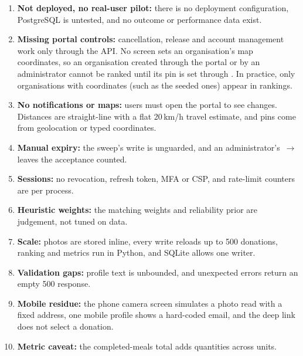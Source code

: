 \begin{enumerate}
  \item \textbf{Not deployed, no real-user pilot:} there is no deployment
    configuration, PostgreSQL is untested, and no outcome or performance data
    exist.
  \item \textbf{Missing portal controls:} cancellation, release and account
    management work only through the API. No screen sets an organisation's map
    coordinates, so an organisation created through the portal or by an
    administrator cannot be ranked until its pin is set through
    . In practice, only organisations with
    coordinates (such as the seeded ones) appear in rankings.
  \item \textbf{No notifications or maps:} users must open the portal to see
    changes. Distances are straight-line with a flat 20\,km/h travel estimate,
    and pins come from geolocation or typed coordinates.
  \item \textbf{Manual expiry:} the sweep's write is unguarded, and an
    administrator's \,$\to$\, leaves the acceptance
    counted.
  \item \textbf{Sessions:} no revocation, refresh token, MFA or CSP, and
    rate-limit counters are per process.
  \item \textbf{Heuristic weights:} the matching weights and reliability prior are
    judgement, not tuned on data.
  \item \textbf{Scale:} photos are stored inline, every write reloads up to 500
    donations, ranking and metrics run in Python, and SQLite allows one writer.
  \item \textbf{Validation gaps:} profile text is unbounded, and unexpected errors
    return an empty 500 response.
  \item \textbf{Mobile residue:} the phone camera screen simulates a photo read
    with a fixed address, one mobile profile shows a hard-coded email, and the
     deep link does not select a donation.
  \item \textbf{Metric caveat:} the completed-meals total adds quantities across
    units.
\end{enumerate}
